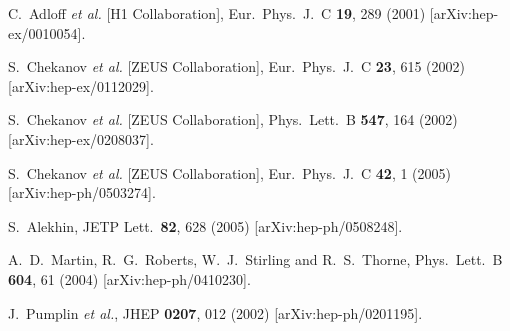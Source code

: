 \begin{thebibliography}{19}

  C.~Adloff {\it et al.} [H1 Collaboration],
  Eur.\ Phys.\ J.\ C {\bf 19}, 289 (2001)
  [arXiv:hep-ex/0010054].

  S.~Chekanov {\it et al.}  [ZEUS Collaboration],
  Eur.\ Phys.\ J.\ C {\bf 23}, 615 (2002)
  [arXiv:hep-ex/0112029].

  S.~Chekanov {\it et al.}  [ZEUS Collaboration],
  Phys.\ Lett.\ B {\bf 547}, 164 (2002)
  [arXiv:hep-ex/0208037].

  S.~Chekanov {\it et al.}  [ZEUS Collaboration],
  Eur.\ Phys.\ J.\ C {\bf 42}, 1 (2005)
  [arXiv:hep-ph/0503274].

  S.~Alekhin,
  JETP Lett.\  {\bf 82}, 628 (2005)
  [arXiv:hep-ph/0508248].

  A.~D.~Martin, R.~G.~Roberts, W.~J.~Stirling and R.~S.~Thorne,
  Phys.\ Lett.\ B {\bf 604}, 61 (2004)
  [arXiv:hep-ph/0410230].

  J.~Pumplin {\it et al.},
  JHEP {\bf 0207}, 012 (2002)
  [arXiv:hep-ph/0201195].


\end{thebibliography}
